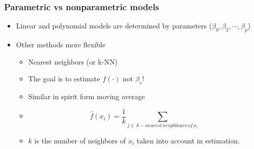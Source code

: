\documentclass[xcolor=x11names,compress, aspectratio=169]{beamer}
\renewcommand{\(}{\begin{columns}}
\renewcommand{\)}{\end{columns}}
\newcommand{\<}[1]{\begin{column}{#1}}
\renewcommand{\>}{\end{column}}
\begin{document}
\begin{frame} %
\frametitle{Parametric vs nonparametric models}

\begin{itemize}[<+->]
     \item Linear and polynomial models are determined by parameters ($\beta_0, \beta_2, \cdots, \beta_p$)
     \item Other methods more flexible
     \begin{itemize}[<+->]
         \item Nearest neighbors  (or k-NN)
         \item[] The goal is to estimate $f(\cdot)$ not $\beta_s$!
         \item[] Similar in spirit form moving average
         \item[] $$ \widehat{f} (x_i) = \frac{1}{k} \sum_{j \in \, k-nearest\, neighbours \, of \, x_i} $$
         \item[] $k$ is the number of neighbors of $x_i$ taken into account in estimation.
     \end{itemize}
\end{itemize}
\end{frame}
\end{document}
